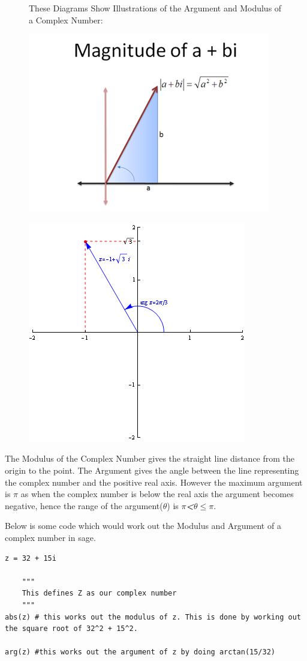 \begin{figure}
These Diagrams Show Illustrations of the Argument and Modulus of a Complex Number:
\begin{minipage}{.5\textwidth}
  \centering
  \includegraphics[width=.4\linewidth]{complex_magnitude}
  \label{fig:test1}
\end{minipage}%
\begin{minipage}{.5\textwidth}
  \centering
  \includegraphics[width=.4\linewidth]{figure_argument}
  \label{fig:test2}
\end{minipage}
\end{figure}


The Modulus of the Complex Number gives the straight line distance from the origin to the point. The Argument gives the angle between the line representing the complex number and the positive real axis. However the maximum argument is \textit{\textbf{$\pi$}} as when the complex number is below the real axis the argument becomes negative, hence the range of the argument($\theta$) is \textit{\textbf{$\pi$\textless$\theta$$\leqslant$$\pi$}}.

Below is some code which would work out the Modulus and Argument of a complex number in sage.
\begin{verbatim}
z = 32 + 15i
	
    """
    This defines Z as our complex number
    """
abs(z) # this works out the modulus of z. This is done by working out the square root of 32^2 + 15^2.

arg(z) #this works out the argument of z by doing arctan(15/32)

\end{verbatim}

